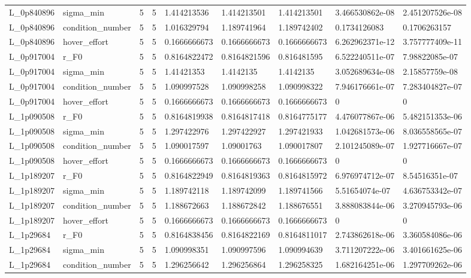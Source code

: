 \begin{tabular}{@{}lllllllll@{}}
L\_0p840896 & sigma\_min & 5 & 5 & 1.414213536 & 1.414213501 & 1.414213501 & 3.466530862e-08 & 2.451207526e-08 \\
L\_0p840896 & condition\_number & 5 & 5 & 1.016329794 & 1.189741964 & 1.189742402 & 0.1734126083 & 0.1706263157 \\
L\_0p840896 & hover\_effort & 5 & 5 & 0.1666666673 & 0.1666666673 & 0.1666666673 & 6.262962371e-12 & 3.757777409e-11 \\
L\_0p917004 & r\_F0 & 5 & 5 & 0.8164822472 & 0.8164821596 & 0.816481595 & 6.522240511e-07 & 7.98822085e-07 \\
L\_0p917004 & sigma\_min & 5 & 5 & 1.41421353 & 1.4142135 & 1.4142135 & 3.052689634e-08 & 2.15857759e-08 \\
L\_0p917004 & condition\_number & 5 & 5 & 1.090997528 & 1.090998258 & 1.090998322 & 7.946176661e-07 & 7.283404827e-07 \\
L\_0p917004 & hover\_effort & 5 & 5 & 0.1666666673 & 0.1666666673 & 0.1666666673 & 0 & 0 \\
L\_1p090508 & r\_F0 & 5 & 5 & 0.8164819938 & 0.8164817418 & 0.8164775177 & 4.476077867e-06 & 5.482151353e-06 \\
L\_1p090508 & sigma\_min & 5 & 5 & 1.297422976 & 1.297422927 & 1.297421933 & 1.042681573e-06 & 8.036558565e-07 \\
L\_1p090508 & condition\_number & 5 & 5 & 1.090017597 & 1.09001763 & 1.090017807 & 2.101245089e-07 & 1.927716667e-07 \\
L\_1p090508 & hover\_effort & 5 & 5 & 0.1666666673 & 0.1666666673 & 0.1666666673 & 0 & 0 \\
L\_1p189207 & r\_F0 & 5 & 5 & 0.8164822949 & 0.8164819363 & 0.8164815972 & 6.976974712e-07 & 8.54516351e-07 \\
L\_1p189207 & sigma\_min & 5 & 5 & 1.189742118 & 1.189742099 & 1.189741566 & 5.51654074e-07 & 4.636753342e-07 \\
L\_1p189207 & condition\_number & 5 & 5 & 1.188672663 & 1.188672842 & 1.188676551 & 3.888083844e-06 & 3.270945793e-06 \\
L\_1p189207 & hover\_effort & 5 & 5 & 0.1666666673 & 0.1666666673 & 0.1666666673 & 0 & 0 \\
L\_1p29684 & r\_F0 & 5 & 5 & 0.8164838456 & 0.8164822169 & 0.8164811017 & 2.743862618e-06 & 3.360584086e-06 \\
L\_1p29684 & sigma\_min & 5 & 5 & 1.090998351 & 1.090997596 & 1.090994639 & 3.711207222e-06 & 3.401661625e-06 \\
L\_1p29684 & condition\_number & 5 & 5 & 1.296256642 & 1.296256864 & 1.296258325 & 1.682164251e-06 & 1.297709262e-06 \\

\end{tabular}
